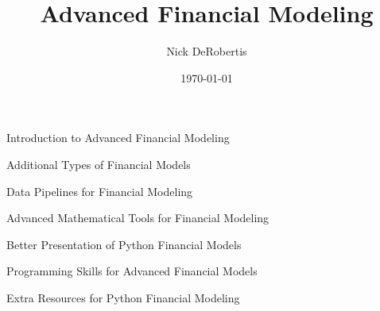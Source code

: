 \documentclass[]{article}
\begin{document}
\title{Advanced Financial Modeling}
\author{Nick DeRobertis}
\date{\today}
\maketitle
\begin{section}{Introduction to Advanced Financial Modeling}

\end{section}
\begin{section}{Additional Types of Financial Models}

\end{section}
\begin{section}{Data Pipelines for Financial Modeling}

\end{section}
\begin{section}{Advanced Mathematical Tools for Financial Modeling}

\end{section}
\begin{section}{Better Presentation of Python Financial Models}

\end{section}
\begin{section}{Programming Skills for Advanced Financial Models}

\end{section}
\begin{section}{Extra Resources for Python Financial Modeling}

\end{section}
\end{document}
